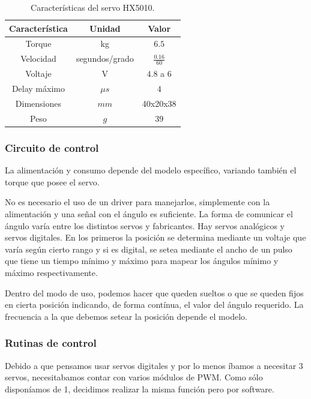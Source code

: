 \begin{table}
	\begin{center}
		\begin{tabular}{|c|c|c|}
			\hline
			Caracter\'istica & Unidad & Valor \\
			\hline
			Torque & kg & $6.5$ \\
			Velocidad & segundos/grado & $\frac{0.16}{60}$ \\
			Voltaje & V & $4.8$ a $6$ \\
			Delay m\'aximo & $\mu s$ & $4$ \\
			Dimensiones & $mm$ & 40x20x38 \\
			Peso & $g$ & $39$ \\
			\hline
		\end{tabular}
	\end{center}
	\caption{Caracter\'isticas del servo HX5010.}
	\label{hT_hx5010}
\end{table}

\subsubsection{Circuito de control}
\label{h_actuadores_servo_circuito}

La alimentaci\'on y consumo depende del modelo espec\'ifico, variando tambi\'en el torque que posee el servo.

No es necesario el uso de un driver para manejarlos, simplemente con la alimentaci\'on y una se\~nal con el \'angulo es suficiente.
La forma de comunicar el \'angulo var\'ia entre los distintos servos y fabricantes.
Hay servos anal\'ogicos y servos digitales.
En los primeros la posici\'on se determina mediante un voltaje que var\'ia seg\'un cierto rango y si es digital, se setea mediante el ancho de
un pulso que tiene un tiempo m\'inimo y m\'aximo para mapear los \'angulos m\'inimo y m\'aximo respectivamente.

Dentro del modo de uso, podemos hacer que queden sueltos o que se queden fijos en cierta posici\'on indicando, de forma cont\'inua, el valor
del \'angulo requerido.
La frecuencia a la que debemos setear la posici\'on depende el modelo.

\subsubsection{Rutinas de control}
\label{h_actuadores_servo_rutinas}

Debido a que pensamos usar servos digitales y por lo menos \'ibamos a necesitar $3$ servos, necesitabamos contar con varios m\'odulos de PWM.
Como s\'olo dispon\'iamos de 1, decidimos realizar la misma funci\'on pero por software.

